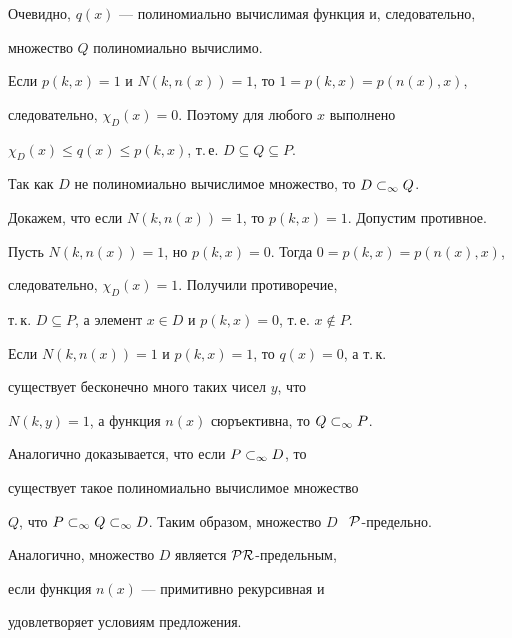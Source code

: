 \begin{pf}
\begin{itemize}
\begin{itemize}
\end{itemize}


\end{itemize}


Очевидно, $q(x)$ --- полиномиально вычислимая функция и, следовательно,


множество $Q$ полиномиально вычислимо.





Если $p(k,x)=1$ и $N(k,n(x))=1$, то $1=p(k,x)=p(n(x),x)$,


следовательно, $\chi_D(x)=0$. Поэтому для любого $x$ выполнено


$\chi_D(x)\le q(x)\le p(k,x)$, т.\,е. $D\subseteq Q\subseteq P$.


Так как $D$ не полиномиально вычислимое множество, то ${D}\subset_\infty{Q}$.





Докажем, что если $N(k,n(x))=1$, то $p(k,x)=1$. Допустим противное.


Пусть $N(k,n(x))=1$, но $p(k,x)=0$. Тогда $0=p(k,x)=p(n(x),x)$,


следовательно, $\chi_D(x)=1$. Получили противоречие,


т.\,к. $D\subseteq P$, а элемент $x\in D$ и $p(k,x)=0$, т.\,е. $x\notin P$.





Если $N(k,n(x))=1$ и $p(k,x)=1$, то $q(x)=0$, а т.\,к.


существует бесконечно много таких чисел $y$, что


$N(k,y)=1$, а функция $n(x)$ сюръективна, то ${Q}\subset_\infty{P}$.





Аналогично доказывается, что если ${P}\subset_\infty{D}$, то


существует такое полиномиально вычислимое множество


$Q$, что ${P}\subset_\infty{{Q}\subset_\infty{D}}$. Таким образом, множество $D$ \ $\cal{P}$-предельно.





Аналогично, множество $D$ является $\cal{PR}$-предельным,


если функция $n(x)$ --- примитивно рекурсивная и 


удовлетворяет условиям предложения.


\end{pf}






